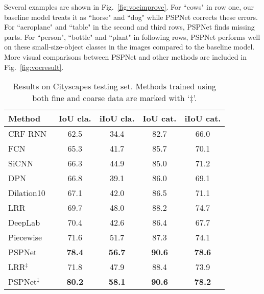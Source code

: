 \documentclass[10pt,twocolumn,letterpaper]{article}
\begin{document}
Several examples are shown in Fig.~\ref{fig:vocimprove}. For ``cows" in row one, our
baseline model treats it as ``horse" and ``dog" while PSPNet corrects these errors. For
``aeroplane" and ``table" in the second and third rows, PSPNet finds missing parts. For
``person", ``bottle" and ``plant" in following rows, PSPNet performs well on these
small-size-object classes in the images compared to the baseline model. More visual
comparisons between PSPNet and other methods are included in Fig.~\ref{fig:vocresult}.

\begin{table}
    \footnotesize
    \begin{center}
        \begin{tabular}{ l | c c c c}
            \toprule[1pt]
            Method & IoU cla. & iIoU cla. & IoU cat. & iIoU cat. \\
            \hline\hline
            CRF-RNN~\cite{zheng2015conditional} & 62.5 & 34.4 & 82.7 & 66.0 \\
            FCN~\cite{long2015fully} & 65.3 & 41.7 & 85.7 & 70.1 \\
            SiCNN~~\cite{krevso2016convolutional} & 66.3 & 44.9 & 85.0 & 71.2 \\
            DPN~\cite{liu2015semantic} & 66.8 & 39.1 & 86.0 & 69.1 \\
            Dilation10~\cite{yu2015multi} & 67.1 & 42.0 & 86.5 & 71.1 \\
            LRR~\cite{ghiasi2016laplacian} & 69.7 & 48.0 & 88.2 & 74.7 \\
            DeepLab~\cite{chen2016deeplab} & 70.4 & 42.6 & 86.4 & 67.7 \\
            Piecewise~\cite{lin2015efficient} & 71.6 & 51.7 & 87.3 & 74.1 \\
            PSPNet & \textbf{78.4} & \textbf{56.7} & \textbf{90.6} & \textbf{78.6} \\
            \hline\hline
            LRR$^\ddag$~\cite{ghiasi2016laplacian} & 71.8 & 47.9 & 88.4 & 73.9 \\
            PSPNet$^\ddag$ & \textbf{80.2} & \textbf{58.1} & \textbf{90.6} & \textbf{78.2} \\
            \bottomrule[1pt]
        \end{tabular}
    \end{center}
    \caption{Results on Cityscapes testing set. Methods trained using both fine and
        coarse data are marked with `$\ddag$'.}
    \label{tab:cityscapescomprison}
\end{table}
\end{document}
